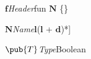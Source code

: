 \documentclass[11pt]{article}
\begin{document}
    \begin{figuregrammar}
        {$\pmb{f}$}{\textit{Header}}{fun $\pmb{N}$ \{\}}
    \end{figuregrammar}

    \begin{figuregrammar}
        {$\pmb{N}$}{\textit{Name}}{$\pmb{l}$($\pmb{l}$ + $\pmb{d}$)*]}
    \end{figuregrammar}

    \begin{figuregrammar}
        {$\pub{T}$}{\textit{Type}}{Boolean}
    \end{figuregrammar}
\end{document}
